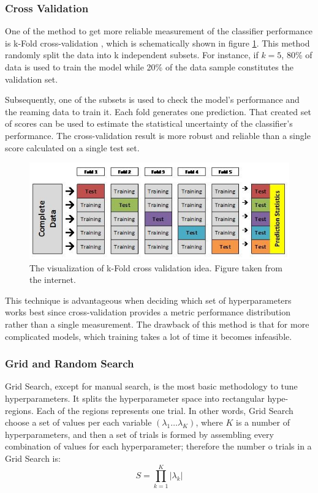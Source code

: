 \subsubsection{Cross Validation}
One of the method to get more reliable measurement of the classifier performance is k-Fold cross-validation \cite{Statistical_Methods}, which is schematically shown in figure \ref{fig:CV}. 
This method randomly split the data into k independent subsets. For instance, if $k = 5$, 80\% of data is used to train the model while 20\% of the data sample constitutes the validation set.   

Subsequently, one of the subsets is used to check the model's performance and the reaming data to train it. Each fold generates one prediction. That created set of scores can be used to estimate the statistical uncertainty of the classifier's performance. The cross-validation result is more robust and reliable than a single score calculated on a single test set.   

\begin{figure}[h]
\centering
\includegraphics{figures/CV.PNG}
\caption{ The visualization of k-Fold cross validation idea. Figure taken from the internet.
\label{fig:CV}}
\end{figure}

This technique is advantageous when deciding which set of hyperparameters works best since cross-validation provides a metric performance distribution rather than a single measurement. The drawback of this method is that for more complicated models, which training takes a lot of time it becomes infeasible.

\subsubsection{Grid and Random Search}
\label{sec:GS and RS}
Grid Search, except for manual search, is the most basic methodology to tune hyperparameters. It splits the hyperparameter space into rectangular hype-regions. Each of the regions represents one trial. In other words, Grid Search choose a set of values per each variable $(\lambda_{1} \ldots \lambda_{K})$, where $K$ is a number of hyperparameters, and then a set of trials is formed by assembling every combination of values for each hyperparameter; therefore the number o trials in a Grid Search is:
\begin{equation}
    S=\prod^{K}_{k=1}|\lambda_{k}|  
\end{equation}

